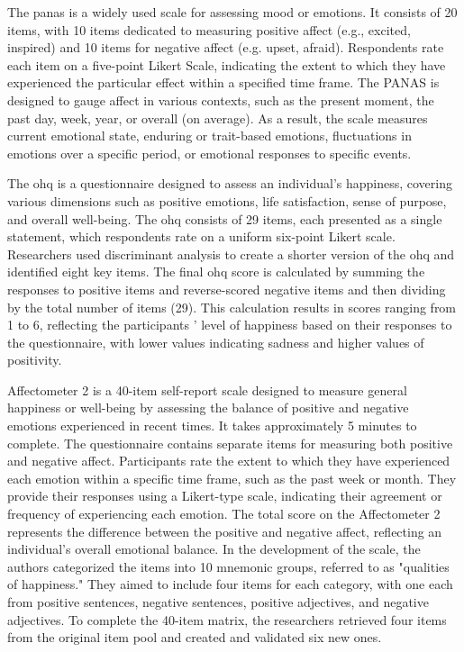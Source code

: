 \documentclass[a4paper,fleqn]{cas-dc}
\begin{document}
The \gls{panas} \cite{tran_positive_2013} is a widely used scale for assessing mood or emotions. It consists of 20 items, with 10 items dedicated to measuring positive affect (e.g., excited, inspired) and 10 items for negative affect (e.g. upset, afraid). Respondents rate each item on a five-point Likert Scale, indicating the extent to which they have experienced the particular effect within a specified time frame. The PANAS is designed to gauge affect in various contexts, such as the present moment, the past day, week, year, or overall (on average). As a result, the scale measures current emotional state, enduring or trait-based emotions, fluctuations in emotions over a specific period, or emotional responses to specific events.

The \gls{ohq} \cite{hills_oxford_2002} is a questionnaire designed to assess an individual's happiness, covering various dimensions such as positive emotions, life satisfaction, sense of purpose, and overall well-being. The \gls{ohq} consists of 29 items, each presented as a single statement, which respondents rate on a uniform six-point Likert scale. Researchers used discriminant analysis to create a shorter version of the \gls{ohq} and identified eight key items. The final \gls{ohq} score is calculated by summing the responses to positive items and reverse-scored negative items and then dividing by the total number of items (29). This calculation results in scores ranging from 1 to 6, reflecting the participants ' level of happiness based on their responses to the questionnaire, with lower values indicating sadness and higher values of positivity.

Affectometer 2 \cite{kammann_affectometer_1983} is a 40-item self-report scale designed to measure general happiness or well-being by assessing the balance of positive and negative emotions experienced in recent times. It takes approximately 5 minutes to complete. The questionnaire contains separate items for measuring both positive and negative affect. Participants rate the extent to which they have experienced each emotion within a specific time frame, such as the past week or month. They provide their responses using a Likert-type scale, indicating their agreement or frequency of experiencing each emotion. The total score on the Affectometer 2 represents the difference between the positive and negative affect, reflecting an individual's overall emotional balance. In the development of the scale, the authors categorized the items into 10 mnemonic groups, referred to as "qualities of happiness." They aimed to include four items for each category, with one each from positive sentences, negative sentences, positive adjectives, and negative adjectives. To complete the 40-item matrix, the researchers retrieved four items from the original item pool and created and validated six new ones.
\end{document}
